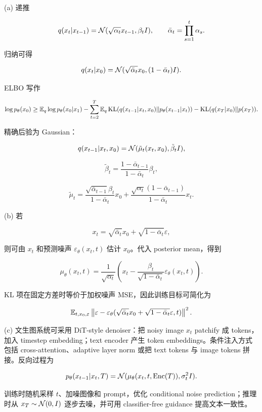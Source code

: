 (a) 递推

\[
  q(x_t|x_{t-1})=\mathcal{N}(\sqrt{\alpha_t}x_{t-1},\beta_t I),
  \qquad
  \bar\alpha_t=\prod_{s=1}^{t}\alpha_s.
\]

归纳可得

\[
  q(x_t|x_0)
  =
  \mathcal{N}(\sqrt{\bar\alpha_t}x_0,(1-\bar\alpha_t)I).
\]

ELBO 写作

\[
  \log p_\theta(x_0)
  \ge
  \mathbb{E}_q\log p_\theta(x_0|x_1)
  -
  \sum_{t=2}^{T}
  \mathbb{E}_q\operatorname{KL}(q(x_{t-1}|x_t,x_0)\|p_\theta(x_{t-1}|x_t))
  -
  \operatorname{KL}(q(x_T|x_0)\|p(x_T)).
\]

精确后验为 Gaussian：

\[
  q(x_{t-1}|x_t,x_0)=\mathcal{N}(\tilde\mu_t(x_t,x_0),\tilde\beta_t I),
\]

\[
  \tilde\beta_t=
  \frac{1-\bar\alpha_{t-1}}{1-\bar\alpha_t}\beta_t,
\]

\[
  \tilde\mu_t
  =
  \frac{\sqrt{\bar\alpha_{t-1}}\beta_t}{1-\bar\alpha_t}x_0
  +
  \frac{\sqrt{\alpha_t}(1-\bar\alpha_{t-1})}{1-\bar\alpha_t}x_t.
\]

(b) 若

\[
  x_t=\sqrt{\bar\alpha_t}x_0+\sqrt{1-\bar\alpha_t}\varepsilon,
\]

则可由 \(x_t\) 和预测噪声 \(\varepsilon_\theta(x_t,t)\) 估计 \(x_0\)。代入 posterior mean，得到

\[
  \mu_\theta(x_t,t)
  =
  \frac{1}{\sqrt{\alpha_t}}
  \left(
    x_t-\frac{\beta_t}{\sqrt{1-\bar\alpha_t}}\varepsilon_\theta(x_t,t)
  \right).
\]

KL 项在固定方差时等价于加权噪声 MSE，因此训练目标可简化为

\[
  \mathbb{E}_{t,x_0,\varepsilon}
  \left\|
    \varepsilon-
    \varepsilon_\theta(
      \sqrt{\bar\alpha_t}x_0+\sqrt{1-\bar\alpha_t}\varepsilon,
      t)
  \right\|^2.
\]

(c) 文生图系统可采用 DiT-style denoiser：把 noisy image \(x_t\) patchify 成 tokens，加入 timestep embedding；text encoder 产生 token embeddings。条件注入方式包括 cross-attention、adaptive layer norm 或把 text tokens 与 image tokens 拼接。反向过程为

\[
  p_\theta(x_{t-1}|x_t,T)
  =
  \mathcal{N}(\mu_\theta(x_t,t,\operatorname{Enc}(T)),\sigma_t^2I).
\]

训练时随机采样 \(t\)、加噪图像和 prompt，优化 conditional noise prediction；推理时从 \(x_T\sim\mathcal{N}(0,I)\) 逐步去噪，并可用 classifier-free guidance 提高文本一致性。
